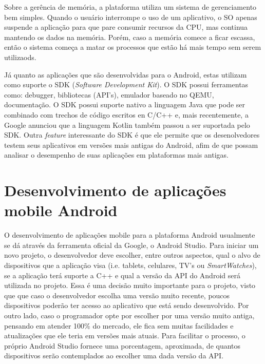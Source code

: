 \documentclass[
    12pt,       %
    openright,      %
    twoside,      %
    a4paper,      %
    english,      %
    french,       %
    spanish,      %
    brazil,       %
    ]{abntex2}
\begin{document}
        Sobre a gerência de memória, a plataforma utiliza um sistema de gerenciamento bem simples.
        Quando o usuário interrompe o uso de um aplicativo, o SO apenas suspende a aplicação para
        que pare consumir recursos da CPU, mas continua mantendo os dados na memória. Porém, caso
        a memória comece a ficar escassa, então o sistema começa a matar os processos que estão
        há mais tempo sem serem utilizaods.

        Já quanto as aplicações que são desenvolvidas para o Android, estas utilizam como suporte
        o SDK (\textit{Software Development Kit}). O SDK possui ferramentas como: debugger,
        bibliotecas (API's), emulador baseado no QEMU, documentação. O SDK possui suporte nativo
        a linguagem Java que pode ser combinado com trechos de código escritos en C/C++ e,
        mais recentemente, a Google anunciou que a linguagem Kotlin também passou a ser suportada
        pelo SDK. Outra \textit{feature} interessante do SDK é que ele permite que os
        desenolvedores testem seus aplicativos em versões mais antigas do Android, afim de
        que possam analisar o desempenho de suas aplicações em plataformas mais antigas.

      \section{Desenvolvimento de aplicações mobile Android}
        O desenvolvimento de aplicações mobile para a plataforma Android usualmente se dá através
        da ferramenta oficial da Google, o Android Studio. Para iniciar um novo projeto, o
        desenvolvedor deve escolher, entre outros aspectos, qual o alvo de dispositivos que a
        aplicação visa (i.e. tablets, celulares, TV's ou \textit{SmartWatches}), se a aplicação
        terá suporte a C++ e qual a versão da API do Android será utilizada no projeto. Essa é
        uma decisão muito importante para o projeto, visto que que caso o desenvolvedor escolha
        uma versão muito recente, poucos dispositivos poderão ter acesso ao aplicativo que está
        sendo desenvolvido. Por outro lado, caso o programador opte por escolher por uma versão
        muito antiga, pensando em atender 100\% do mercado, ele fica sem muitas facilidades e
        atualizações que ele teria em versões mais atuais. Para facilitar o processo, o próprio
        Android Studio fornece uma porcentagem, aproximada, de quantos dispositivos serão contemplados
        ao escolher uma dada versão da API.
\end{document}
